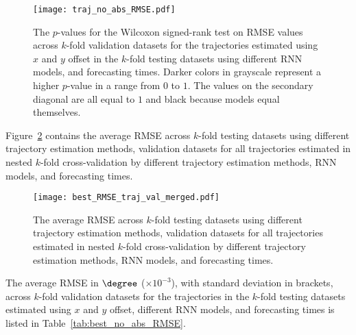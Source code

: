 \begin{figure}[!ht]
	\centering
	\texttt{[image: traj\_no\_abs\_RMSE.pdf]}
	\caption{The $p$-values for the Wilcoxon signed-rank test on RMSE values across $k$-fold validation datasets for the trajectories estimated using $x$ and $y$ offset in the $k$-fold testing datasets using different RNN models, and forecasting times. Darker colors in grayscale represent a higher $p$-value in a range from $0$ to $1$. The values on the secondary diagonal are all equal to $1$ and black because models equal themselves.}
	\label{fig:traj_no_abs_RMSE}
\end{figure}

Figure~\ref{fig:best_RMSE_traj_val_merged} contains the average RMSE across $k$-fold testing datasets using different trajectory estimation methods, validation datasets for all trajectories estimated in nested $k$-fold cross-validation by different trajectory estimation methods, RNN models, and forecasting times.

\begin{figure}[!ht]
	\centering
	\texttt{[image: best\_RMSE\_traj\_val\_merged.pdf]}
	\caption{The average RMSE across $k$-fold testing datasets using different trajectory estimation methods, validation datasets for all trajectories estimated in nested $k$-fold cross-validation by different trajectory estimation methods, RNN models, and forecasting times.}
	\label{fig:best_RMSE_traj_val_merged}
\end{figure}

The average RMSE in $\degree$ ($\times 10^{-3}$), with standard deviation in brackets, across $k$-fold validation datasets for the trajectories in the $k$-fold testing datasets estimated using $x$ and $y$ offset, different RNN models, and forecasting times is listed in Table~\ref{tab:best_no_abs_RMSE}.

